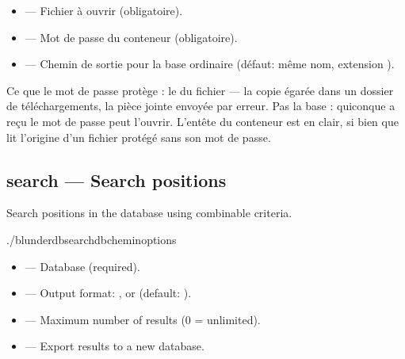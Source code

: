 \documentclass[letterpaper,10pt,english]{sphinxmanual}
\begin{document}
\sphinxAtStartPar
{}
\begin{itemize}
\item {} 
\sphinxAtStartPar
{} — Fichier  à ouvrir (obligatoire).

\item {} 
\sphinxAtStartPar
{} — Mot de passe du conteneur (obligatoire).

\item {} 
\sphinxAtStartPar
{} — Chemin de sortie pour la base ordinaire (défaut: même nom,
extension ).

\end{itemize}

\sphinxAtStartPar
Ce que le mot de passe protège : le  du fichier — la copie égarée
dans un dossier de téléchargements, la pièce jointe envoyée par erreur. Pas la
base : quiconque a reçu le mot de passe peut l’ouvrir. L’en\sphinxhyphen{}tête du conteneur
est en clair, si bien que  lit l’origine d’un fichier
protégé sans son mot de passe.


\subsection{search — Search positions}
\label{\detokenize{cli:search-rechercher-des-positions}}
\sphinxAtStartPar
Search positions in the database using combinable criteria.

\begin{sphinxVerbatim}[commandchars=\\\{\}]
./blunderdbsearch\PYGZhy{}\PYGZhy{}db\PYGZlt{}chemin\PYGZgt{}\PYG{o}{[}options\PYG{o}{]}
\end{sphinxVerbatim}

\sphinxAtStartPar
{}
\begin{itemize}
\item {} 
\sphinxAtStartPar
{} — Database (required).

\item {} 
\sphinxAtStartPar
{} — Output format: ,  or  (default: ).

\item {} 
\sphinxAtStartPar
{} — Maximum number of results (0 = unlimited).

\item {} 
\sphinxAtStartPar
{} — Export results to a new database.

\end{itemize}
\end{document}
